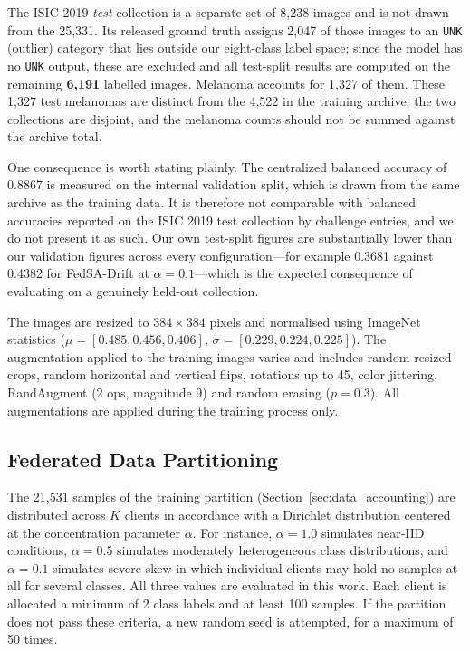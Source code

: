 \documentclass{ieeeaccess}
\newcommand{\sadrift}{FedSA-Drift}
\begin{document}
The ISIC 2019 \emph{test} collection is a separate set of 8,238 images and is not drawn from the 25,331. Its released ground truth assigns 2,047 of those images to an \texttt{UNK} (outlier) category that lies outside our eight-class label space; since the model has no \texttt{UNK} output, these are excluded and all test-split results are computed on the remaining \textbf{6,191} labelled images. Melanoma accounts for 1,327 of them. These 1,327 test melanomas are distinct from the 4,522 in the training archive; the two collections are disjoint, and the melanoma counts should not be summed against the archive total.

One consequence is worth stating plainly. The centralized balanced accuracy of 0.8867 is measured on the internal validation split, which is drawn from the same archive as the training data. It is therefore not comparable with balanced accuracies reported on the ISIC 2019 test collection by challenge entries, and we do not present it as such. Our own test-split figures are substantially lower than our validation figures across every configuration---for example 0.3681 against 0.4382 for \sadrift{} at $\alpha{=}0.1$---which is the expected consequence of evaluating on a genuinely held-out collection.

The images are resized to $384 \times 384$ pixels and normalised using ImageNet statistics ($\mu = [0.485, 0.456, 0.406]$, $\sigma = [0.229, 0.224, 0.225]$). The augmentation applied to the training images varies and includes random resized crops, random horizontal and vertical flips, rotations up to 45\textdegree, color jittering, RandAugment (2 ops, magnitude 9) and random erasing ($p=0.3$). All augmentations are applied during the training process only.

\subsection{Federated Data Partitioning}

The 21,531 samples of the training partition (Section~\ref{sec:data_accounting}) are distributed across $K$ clients in accordance with a Dirichlet distribution centered at the concentration parameter $\alpha$. For instance, $\alpha = 1.0$ simulates near-IID conditions, $\alpha = 0.5$ simulates moderately heterogeneous class distributions, and $\alpha = 0.1$ simulates severe skew in which individual clients may hold no samples at all for several classes. All three values are evaluated in this work. Each client is allocated a minimum of 2 class labels and at least 100 samples. If the partition does not pass these criteria, a new random seed is attempted, for a maximum of 50 times.
\end{document}
